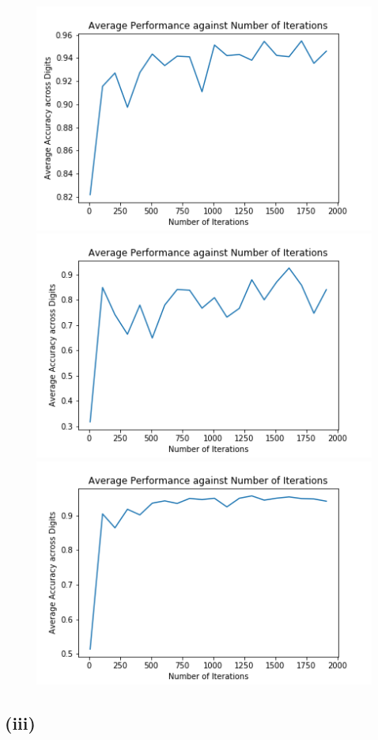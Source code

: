 \documentclass[twoside,11pt]{homework}
\begin{document}
	\begin{figure}[H]
		\includegraphics[]{q6/img/iterations_v0.png}
		\includegraphics[]{q6/img/iterations_v1.png}
		\includegraphics[]{q6/img/iterations_v2.png}
	\end{figure}

	


\subsection*{(iii)}
\end{document}
